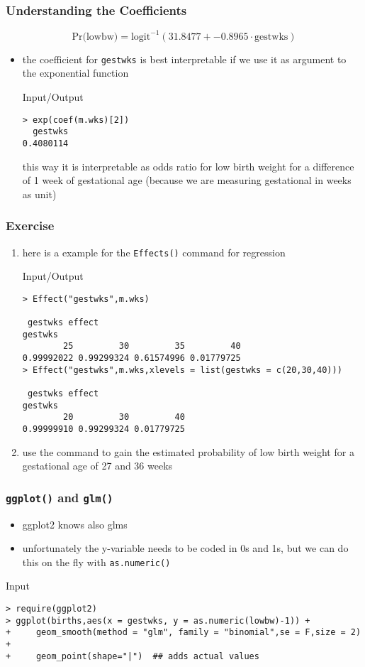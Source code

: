 \begin{frame}[fragile]\frametitle{Understanding the Coefficients}
$$\mbox{Pr(lowbw)}=\mbox{logit}^{-1}(31.8477 + -0.8965 \cdot \mbox{gestwks}) $$
\begin{itemize}
\item the coefficient for \texttt{gestwks} is best interpretable if we use it as argument to the exponential function
  \begin{exampleblock}{Input/Output}
\begin{verbatim}
> exp(coef(m.wks)[2])
  gestwks 
0.4080114 
\end{verbatim}
  \end{exampleblock}
this way it is interpretable as odds ratio for low birth weight for a difference of 1 week of gestational age (because we are measuring gestational in weeks as unit)
\end{itemize}
\end{frame}


\begin{frame}[fragile]\frametitle{Exercise}
  \begin{enumerate}
  \item here is a example for the \texttt{Effects()} command for regression
    \begin{exampleblock}{Input/Output}\scriptsize
\begin{verbatim}
> Effect("gestwks",m.wks)

 gestwks effect
gestwks
        25         30         35         40 
0.99992022 0.99299324 0.61574996 0.01779725 
> Effect("gestwks",m.wks,xlevels = list(gestwks = c(20,30,40)))

 gestwks effect
gestwks
        20         30         40 
0.99999910 0.99299324 0.01779725   
\end{verbatim}
    \end{exampleblock}\normalsize
\item use the command to gain the estimated probability of low birth weight for a gestational age of 27 and 36 weeks
  \end{enumerate}
\end{frame}


\begin{frame}[fragile]\frametitle{\texttt{ggplot()} and \texttt{glm()}}
  \begin{itemize}
  \item ggplot2 knows also glms
  \item unfortunately the y-variable needs to be coded in 0s and 1s, but we can do this on the fly with \texttt{as.numeric()}
  \end{itemize}
  \begin{exampleblock}{Input}\scriptsize
\begin{verbatim}
> require(ggplot2)
> ggplot(births,aes(x = gestwks, y = as.numeric(lowbw)-1)) +
+     geom_smooth(method = "glm", family = "binomial",se = F,size = 2) +
+     geom_point(shape="|")  ## adds actual values  
\end{verbatim}
  \end{exampleblock}
\end{frame}


